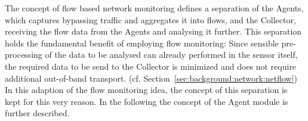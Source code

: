 The concept of flow based network monitoring defines a separation of the Agents, which captures bypassing traffic and aggregates it into flows, and the Collector, receiving the flow data from the Agents and analysing it further.
This separation holds the fundamental benefit of employing flow monitoring: Since sensible pre-processing of the data to be analysed can already performed in the sensor itself, the required data to be send to the Collector is minimized and does not require additional out-of-band transport. (cf. Section~\ref{sec:background:network:netflow})
In this adaption of the flow monitoring idea, the concept of this separation is kept for this very reason. In the following the concept of the Agent module is further described.

